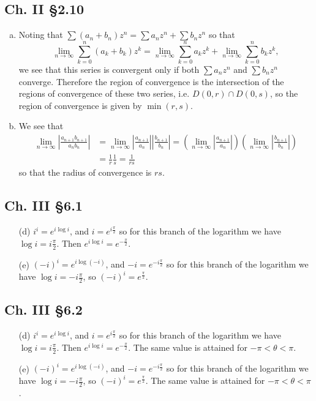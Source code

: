 \documentclass{article}
\begin{document}
\subsection*{Ch. II \S 2.10}
\begin{enumerate}[(a)]
  \item{
    Noting that
    $\sum (a_n + b_n) z^n = \sum a_n z^n + \sum b_n z^n$
    so that
    $$
      \lim_{n \to \infty} \sum_{k=0}^n (a_k + b_k) z^k
    = \lim_{n \to \infty} \sum_{k=0}^n a_k z^k
    + \lim_{n \to \infty} \sum_{k=0}^n b_k z^k,
    $$
    we see that this series is convergent only if
    both $\sum a_n z^n$ and $\sum b_n z^n$ converge. Therefore
    the region of convergence is the intersection of the
    regions of convergence of these two series, i.e.
    $D(0, r) \cap D(0, s)$, so the region of convergence is
    given by $\min(r, s)$.
  }
  \item{
    We see that
    \begin{align*}
       \lim_{n \to \infty} \left|\frac{a_{n+1} b_{n+1}}{a_n b_n}\right|
    &= \lim_{n \to \infty} \left|\frac{a_{n+1}}{a_n}\right|
                       \left|\frac{b_{n+1}}{b_n}\right|
     = \left(\lim_{n \to \infty}
        \left|\frac{a_{n+1}}{a_n}\right|
       \right)
       \left(\lim_{n \to \infty}
         \left|\frac{b_{n+1}}{b_n}\right|
       \right) \\
    &= \frac{1}{r} \frac{1}{s}
     = \frac{1}{rs}
    \end{align*}
    so that the radius of convergence is $rs$.
  }
\end{enumerate}

\subsection*{Ch. III \S 6.1}
\begin{itemize}
  \item[(d)]{
    $i^i = e^{i \log i}$,
    and $i = e^{i \frac{\pi}{2}}$ so for this branch of the logarithm
    we have $\log i = i\frac{\pi}{2}$. Then
    $e^{i \log i} = e^{-\frac{\pi}{2}}$.
  }
  \item[(e)]{
    $(-i)^i = e^{i \log (-i)}$, and $-i = e^{-i\frac{\pi}{2}}$ so for
    this branch of the logarithm we have $\log i = -i\frac{\pi}{2}$,
    so $(-i)^i = e^{\frac{\pi}{2}}$.
  }
\end{itemize}

\subsection*{Ch. III \S 6.2}
\begin{itemize}
  \item[(d)]{
    $i^i = e^{i \log i}$,
    and $i = e^{i \frac{\pi}{2}}$ so for this branch of the logarithm
    we have $\log i = i\frac{\pi}{2}$. Then
    $e^{i \log i} = e^{-\frac{\pi}{2}}$. The same value is attained
    for $-\pi < \theta < \pi$.
  }
  \item[(e)]{
    $(-i)^i = e^{i \log (-i)}$, and $-i = e^{-i\frac{\pi}{2}}$ so for
    this branch of the logarithm we have $\log i = -i\frac{\pi}{2}$,
    so $(-i)^i = e^{\frac{\pi}{2}}$. The same value is attained
    for $-\pi < \theta < \pi$.
  }
\end{itemize}
\end{document}
